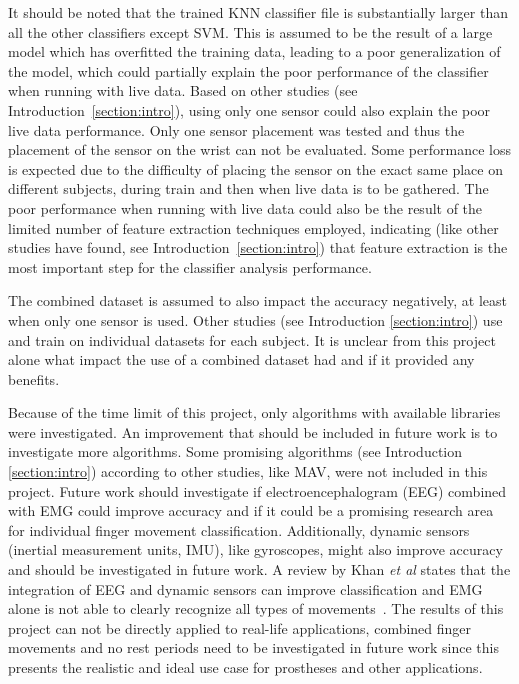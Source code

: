 It should be noted that the trained KNN classifier file is substantially larger than all the other classifiers except SVM. This is assumed to be the result of a large model which has overfitted the training data, leading to a poor generalization of the model, which could partially explain the poor performance of the classifier when running with live data. 
Based on other studies (see Introduction~\ref{section:intro}), using only one sensor could also explain the poor live data performance.
Only one sensor placement was tested and thus the placement of the sensor on the wrist can not be evaluated. Some performance loss is expected due to the difficulty of placing the sensor on the exact same place on different subjects, during train and then when live data is to be gathered.
The poor performance when running with live data could also be the result of the limited number of feature extraction techniques employed, indicating (like other studies have found, see Introduction~\ref{section:intro}) that feature extraction is the most important step for the classifier analysis performance.

The combined dataset is assumed to also impact the accuracy negatively, at least when only one sensor is used. Other studies (see Introduction \ref{section:intro}) use and train on individual datasets for each subject. It is unclear from this project alone what impact the use of a combined dataset had and if it provided any benefits.


Because of the time limit of this project, only algorithms with available libraries were investigated. An improvement that should be included in future work is to investigate more algorithms. Some promising algorithms (see Introduction \ref{section:intro}) according to other studies, like MAV, were not included in this project.
Future work should investigate if electroencephalogram (EEG) combined with EMG could improve accuracy and if it could be a promising research area for individual finger movement classification. Additionally, dynamic sensors (inertial measurement units, IMU), like gyroscopes, might also improve accuracy and should be investigated in future work. A review by Khan \textit{et al} states that the integration of EEG and dynamic sensors can improve classification and EMG alone is not able to clearly recognize all types of movements~\cite{khanSelectionFeaturesClassifiers2020}.
The results of this project can not be directly applied to real-life applications, combined finger movements and no rest periods need to be investigated in future work since this presents the realistic and ideal use case for prostheses and other applications.









